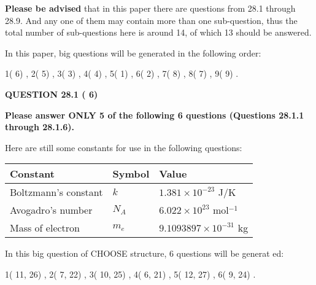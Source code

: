 \documentclass[12pt]{article}
\begin{document}
 
{\textbf{\large{Please be advised}}} that in this paper there are questions from
28.1 through
28.9.
And any one of them may contain more than one sub-question, thus the total number
of sub-questions here is around 14, of which
13 should be answered.
 
\vspace{0.3in}
 
 
   
   
   
\vspace{0.2in}
   
In this paper, big questions will be generated in the following order: 
   
   
            1(          6)
 ,
            2(          5)
 ,
            3(          3)
 ,
            4(          4)
 ,
            5(          1)
 ,
            6(          2)
 ,
            7(          8)
 ,
            8(          7)
 ,
            9(          9)
 .
  
\vspace{0.2in}
  
{\textbf{\Large{QUESTION
28.1 
 (          6)
}}}
  
  
 
{\textbf{\Large{Please answer ONLY
5 of the following
6 questions (Questions
28.1.1 through
28.1.6). }}}
 
Here are still some constants for use in the following questions:
 
 
\noindent\begin{tabular}{|l|l|l|}
\hline
Constant & Symbol & Value \\
\hline
 
Boltzmann's constant &
$k$ &
 $ 1.381 \times 10^{-23} $
J/K \\
\hline
 
Avogadro's number &
$N_A$ &
 $ 6.022 \times 10^{23} $
mol$^{-1}$ \\
\hline
 
Mass of electron &
$m_e$ &
 $ 9.1093897 \times 10^{-31} $
kg \\
\hline
 
\end{tabular}
 
   
\vspace{0.2in}
   
 In this big question of CHOOSE structure,           6 questions will be generat
 ed: 
  
  
            1(         11,         26)
 ,
            2(          7,         22)
 ,
            3(         10,         25)
 ,
            4(          6,         21)
 ,
            5(         12,         27)
 ,
            6(          9,         24)
 .
  
\end{document}
